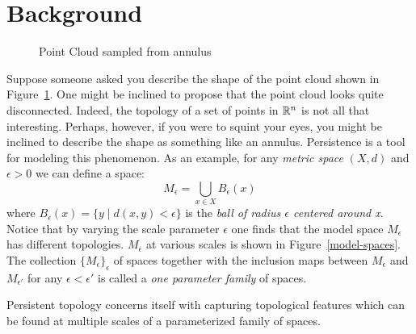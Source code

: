 \section{Background}

\begin{figure}
\centering
{}      
 \hspace{.5cm}
 \caption{Point Cloud sampled from annulus}
\label{fig:point-cloud-annulus}
 \end{figure}

Suppose someone asked you describe the shape of the point cloud shown in Figure~\ref{fig:point-cloud-annulus}. One might be inclined to propose that the point cloud looks quite disconnected. Indeed, the topology of a set of points in $\mathbb{R}^n$ is not all that interesting. Perhaps, however, if you were to squint your eyes, you might be inclined to describe the shape as something like an annulus. Persistence is a tool for modeling this phenomenon. As an example, for any \emph{metric space} $(X,d)$ and  $\epsilon > 0$ we can define a space: \[ M_\epsilon = \bigcup_{x \in X} B_{\epsilon}(x) \] where $B_{\epsilon}(x) = \{ y \mid d(x,y) < \epsilon\} $ is the \emph{ball of radius $\epsilon$ centered around x}. Notice that by varying the scale parameter $\epsilon$ one finds that the model space $M_\epsilon$ has different topologies. $M_\epsilon$ at various scales is shown in Figure~\ref{model-spaces}. The collection $\{M_\epsilon\}_\epsilon$ of spaces together with the inclusion maps between $M_\epsilon$ and $M_{\epsilon'}$ for any $\epsilon < \epsilon'$ is called a \emph{one parameter family} of spaces.   
 
Persistent topology concerns itself with capturing topological features which can be found at multiple scales of a parameterized family of spaces.


